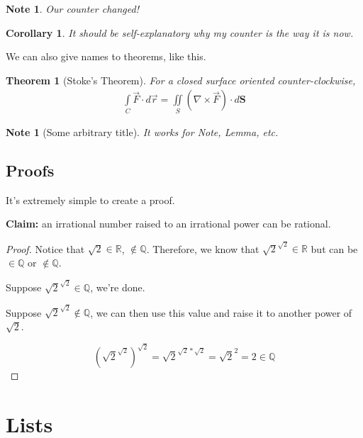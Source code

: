 \documentclass[12pt]{article}
\newtheorem*{Theorem}{Theorem}
\newtheorem{Corollary}{Corollary}[Lemma]
\newtheorem{Note}[Lemma]{Note}
\begin{document}
\begin{flushleft}
\begin{Note}
Our counter changed!
\end{Note}

\begin{Corollary}
It should be self-explanatory why my counter is the way it is now.
\end{Corollary}

We can also give names to theorems, like this.

\begin{Theorem}[Stoke's Theorem]
For a closed surface oriented counter-clockwise,
\begin{gather*}
\int\limits_C \vec{F} \cdot d\vec{r} = \iint\limits_S (\nabla \times \vec{F}) \cdot d\textbf{S} 
\end{gather*}
\end{Theorem}

\begin{Note}[Some arbitrary title]
It works for \emph{Note}, \emph{Lemma}, etc.
\end{Note}

\subsection{Proofs}

It's extremely simple to create a proof.

\medskip

\textbf{Claim:} an irrational number raised to an irrational power can be rational.
\begin{proof}

Notice that $\sqrt{2} \in \mathbb{R}$, $\notin \mathbb{Q}$. Therefore, we know that $\sqrt{2}^{\sqrt{2}} \in \mathbb{R}$ but can be $\in \mathbb{Q}$ or $\notin \mathbb{Q}$.

Suppose $\sqrt{2}^{\sqrt{2}} \in \mathbb{Q}$, we're done.

Suppose $\sqrt{2}^{\sqrt{2}} \notin \mathbb{Q}$, we can then use this value and raise it to another power of $\sqrt{2}$.

\[ (\sqrt{2}^{\sqrt{2}})^{\sqrt{2}} = \sqrt{2}^{\sqrt{2} * \sqrt{2}} = \sqrt{2}^2 = 2 \in \mathbb{Q} \]
\end{proof}

\section{Lists}


\end{flushleft}
\end{document}
